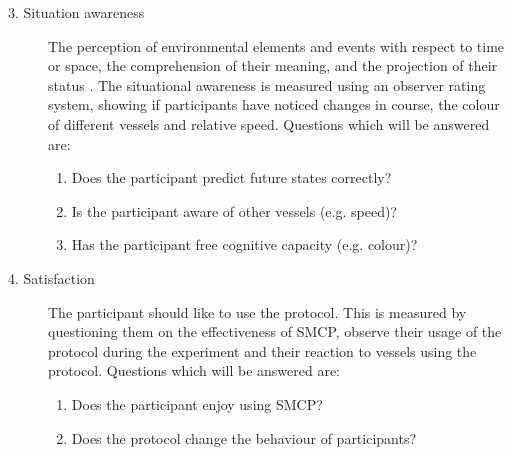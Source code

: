 \begin{description}
	\item [3. Situation awareness] \SA The perception of environmental elements and events with respect to time or space, the comprehension of their meaning, and the projection of their status \cite{Naderpour2016}. The situational awareness is measured using an observer rating system, showing if participants have noticed changes in course, the colour of different vessels and relative speed. Questions which will be answered are:
	\begin{spacing}{1}
	\begin{enumerate}
		\item Does the participant predict future states correctly?
		\item Is the participant aware of other vessels (e.g. speed)?
		\item Has the participant free cognitive capacity (e.g. colour)?
	\end{enumerate}
	\end{spacing}
	
	\item [4. Satisfaction] \satisfaction The participant should like to use the protocol. This is measured by questioning them on the effectiveness of \ac{SMCP}, observe their usage of the protocol during the experiment and their reaction to vessels using the protocol. Questions which will be answered are:
	\begin{spacing}{1}
	\begin{enumerate}
		\item Does the participant enjoy using \ac{SMCP}?
		\item Does the protocol change the behaviour of participants?
	\end{enumerate}
	\end{spacing}
\end{description}

